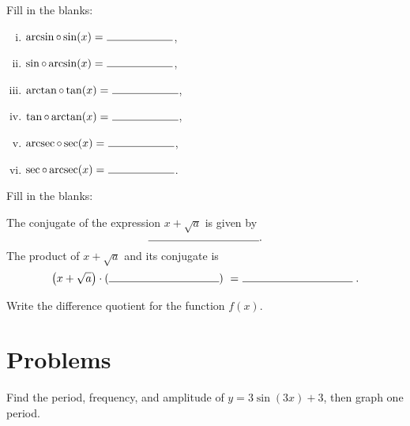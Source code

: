 \documentclass[12pt]{amsart}
\begin{document}
\begin{thm}[6 Points]
  Fill in the blanks:
  \vspace{.15in}
  \begin{multicols}{2}
    \begin{enumerate}[(i)]
    \item
      $\displaystyle{\arcsin \circ \sin(x) =\ \line(1,0){60}}$,
      \vspace{.15in}
    \item
      $\displaystyle{\sin \circ \arcsin(x) =\ \line(1,0){60}}$,
      \vspace{.15in}
    \item
      $\displaystyle{\arctan \circ \tan(x) =\ \line(1,0){60}}$,
      \vspace{.15in}
    \item
      $\displaystyle{\tan \circ \arctan(x) =\ \line(1,0){60}}$,
      \vspace{.15in}
    \item
      $\displaystyle{\operatorname{arcsec} \circ \sec(x) =\ \line(1,0){60}}$,
      \vspace{.15in}
    \item
      $\displaystyle{\sec \circ \operatorname{arcsec}(x) =\ \line(1,0){60}}$.
    \end{enumerate}
  \end{multicols}
\end{thm}

\begin{thm}[1 Point]
  Fill in the blanks:
  \begin{center}
    The conjugate of the expression $x + \sqrt{a}$ is given by 
    \vspace{.15in}
    $$\line(1,0){100}.$$
    The product of $x + \sqrt{a}$ and its conjugate is
    \vspace{.15in}
    $$\left(x + \sqrt{a}\right) \cdot \left(\line(1,0){100}\right)\ =\ \line(1,0){100}.$$
  \end{center}
\end{thm}

\begin{thm}[1 Point]
  Write the difference quotient for the function $f(x)$.
\end{thm}
\newpage

\section{Problems}
\setcounter{thm}{0}
\begin{thm}[8 Points]\label{ex1}
  Find the period, frequency, and amplitude of $y = 3\sin(3x) + 3$, then graph one period.
\end{thm}
\end{document}

